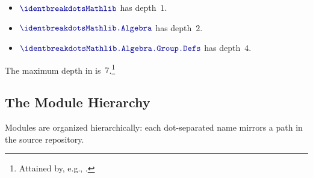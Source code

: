 \begin{example}
\leavevmode
\begin{itemize}
  \item $\module{Mathlib}$ has depth~$1$.
  \item $\module{Mathlib.Algebra}$ has depth~$2$.
  \item $\module{Mathlib.Algebra.Group.Defs}$ has depth~$4$.
\end{itemize}
The maximum depth in  is~$7$.\footnote{Attained by, e.g., .}
\end{example}

\subsection{The Module Hierarchy}
\label{sec:namespace-tree}

Modules are organized hierarchically: each dot-separated name mirrors a path in the source repository.

